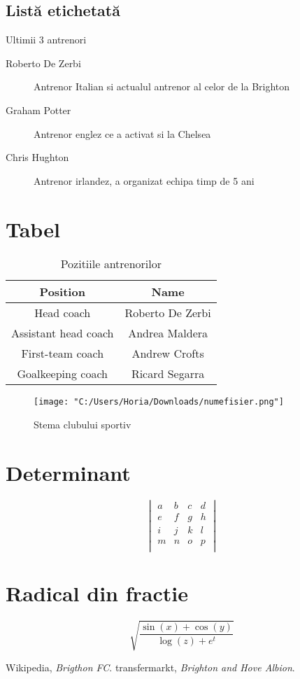 \documentclass{article}
\begin{document}
\subsection{Listă etichetată}
\hspace{0.5cm}Ultimii 3 antrenori
\begin{description}
    \item[Roberto De Zerbi] Antrenor Italian si actualul antrenor al celor de la Brighton
    \item[Graham Potter] Antrenor englez ce a activat si la Chelsea
    \item[Chris Hughton] Antrenor irlandez, a organizat echipa timp de 5 ani
\end{description}



\section{Tabel}
\begin{table}[h]
    \centering
    \begin{tabular}{|c|c|}
        \hline
        Position & Name \\
        \hline
        Head coach & Roberto De Zerbi \\
	Assistant head coach & Andrea Maldera\\
	First-team coach & Andrew Crofts\\
	Goalkeeping coach & Ricard Segarra\\
	\hline
    \end{tabular}
    \caption{Pozitiile antrenorilor}
    \label{tab:tabel1}
\end{table}


\begin{figure}
	\centering
    \texttt{[image: "C:/Users/Horia/Downloads/numefisier.png"]}
    \caption{Stema clubului sportiv}
    \label{fig:figura1}
\end{figure}


\section{Determinant}
\[
\begin{vmatrix}
a & b & c & d \\
e & f & g & h \\
i & j & k & l \\
m & n & o & p \\
\end{vmatrix}
\]

\section{Radical din fractie}
\[
\sqrt{\frac{{\sin(x) + \cos(y)}}{{\log(z) + e^t}}}
\]


\begin{thebibliography}{9}
     Wikipedia, \emph{Brigthon FC}.
     transfermarkt, \emph{Brighton and Hove Albion}.
\end{thebibliography}
\end{document}

